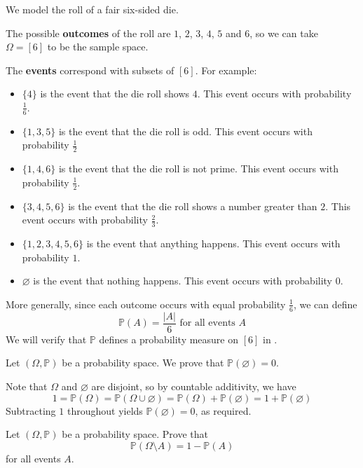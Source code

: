 \begin{example}
\label{exProbabilitySpaceSixSidedDie}
We model the roll of a fair six-sided die.

The possible \textbf{outcomes} of the roll are $1$, $2$, $3$, $4$, $5$ and $6$, so we can take $\Omega = [6]$ to be the sample space.

The \textbf{events} correspond with subsets of $[6]$. For example:
\begin{itemize}
\item $\{ 4 \}$ is the event that the die roll shows $4$. This event occurs with probability $\frac{1}{6}$.
\item $\{ 1, 3, 5 \}$ is the event that the die roll is odd. This event occurs with probability $\frac{1}{2}$
\item $\{ 1, 4, 6 \}$ is the event that the die roll is not prime. This event occurs with probability $\frac{1}{2}$.
\item $\{ 3, 4, 5, 6 \}$ is the event that the die roll shows a number greater than $2$. This event occurs with probability $\frac{2}{3}$.
\item $\{ 1, 2, 3, 4, 5, 6 \}$ is the event that anything happens. This event occurs with probability $1$.
\item $\varnothing$ is the event that nothing happens. This event occurs with probability $0$.
\end{itemize}

More generally, since each outcome occurs with equal probability $\frac{1}{6}$, we can define
\[ \mathbb{P}(A) = \frac{|A|}{6} \text{ for all events } A \]
We will verify that $\mathbb{P}$ defines a probability measure on $[6]$ in .
\end{example}

\begin{example}
\label{exProbabilityOfEmptySet}
Let $(\Omega,\mathbb{P})$ be a probability space. We prove that $\mathbb{P}(\varnothing)=0$.

Note that $\Omega$ and $\varnothing$ are disjoint, so by countable additivity, we have
\[ 1 = \mathbb{P}(\Omega) = \mathbb{P}(\Omega \cup \varnothing) = \mathbb{P}(\Omega) + \mathbb{P}(\varnothing) = 1 + \mathbb{P}(\varnothing) \]
Subtracting $1$ throughout yields $\mathbb{P}(\varnothing) = 0$, as required.
\end{example}

\begin{exercise}
Let $(\Omega,\mathbb{P})$ be a probability space. Prove that
\[ \mathbb{P}(\Omega \setminus A) = 1-\mathbb{P}(A) \]
for all events $A$.
\end{exercise}


